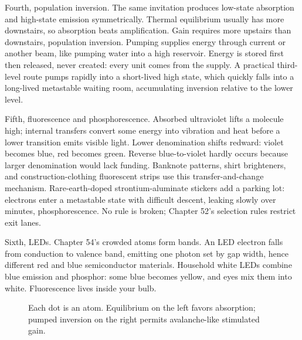 \begin{mainline}
Fourth, population inversion. The same invitation produces low-state absorption and high-state emission symmetrically. Thermal equilibrium usually has more downstairs, so absorption beats amplification. Gain requires more upstairs than downstairs, population inversion. Pumping supplies energy through current or another beam, like pumping water into a high reservoir. Energy is stored first then released, never created: every unit comes from the supply. A practical third-level route pumps rapidly into a short-lived high state, which quickly falls into a long-lived metastable waiting room, accumulating inversion relative to the lower level.

Fifth, fluorescence and phosphorescence. Absorbed ultraviolet lifts a molecule high; internal transfers convert some energy into vibration and heat before a lower transition emits visible light. Lower denomination shifts redward: violet becomes blue, red becomes green. Reverse blue-to-violet hardly occurs because larger denomination would lack funding. Banknote patterns, shirt brighteners, and construction-clothing fluorescent strips use this transfer-and-change mechanism. Rare-earth-doped strontium-aluminate stickers add a parking lot: electrons enter a metastable state with difficult descent, leaking slowly over minutes, phosphorescence. No rule is broken; Chapter 52's selection rules restrict exit lanes.

Sixth, LEDs. Chapter 54's crowded atoms form bands. An LED electron falls from conduction to valence band, emitting one photon set by gap width, hence different red and blue semiconductor materials. Household white LEDs combine blue emission and phosphor: some blue becomes yellow, and eyes mix them into white. Fluorescence lives inside your bulb.
\end{mainline}

\begin{figure}[htbp]
\centering
{}
\caption{Each dot is an atom. Equilibrium on the left favors absorption; pumped inversion on the right permits avalanche-like stimulated gain.}
\end{figure}

